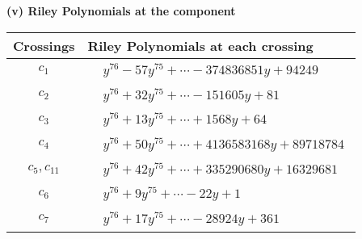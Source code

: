 \documentclass[1p]{elsarticle_modified}
\theoremstyle{definition}
\begin{document}
\newpage\renewcommand{\arraystretch}{1}
\flushleft \textbf{(v) Riley Polynomials at the component}\newline \\
\begin{tabular}{m{50pt}|m{274pt}}
Crossings & \hspace{64pt}Riley Polynomials at each crossing \\
\hline $$\begin{aligned}c_{1}\end{aligned}$$&$\begin{aligned}
&y^{76}-57 y^{75}+\cdots-374836851 y+94249
\end{aligned}$\\
\hline $$\begin{aligned}c_{2}\end{aligned}$$&$\begin{aligned}
&y^{76}+32 y^{75}+\cdots-151605 y+81
\end{aligned}$\\
\hline $$\begin{aligned}c_{3}\end{aligned}$$&$\begin{aligned}
&y^{76}+13 y^{75}+\cdots+1568 y+64
\end{aligned}$\\
\hline $$\begin{aligned}c_{4}\end{aligned}$$&$\begin{aligned}
&y^{76}+50 y^{75}+\cdots+4136583168 y+89718784
\end{aligned}$\\
\hline $$\begin{aligned}c_{5},c_{11}\end{aligned}$$&$\begin{aligned}
&y^{76}+42 y^{75}+\cdots+335290680 y+16329681
\end{aligned}$\\
\hline $$\begin{aligned}c_{6}\end{aligned}$$&$\begin{aligned}
&y^{76}+9 y^{75}+\cdots-22 y+1
\end{aligned}$\\
\hline $$\begin{aligned}c_{7}\end{aligned}$$&$\begin{aligned}
&y^{76}+17 y^{75}+\cdots-28924 y+361
\end{aligned}$\\

\end{tabular}
\end{document}
